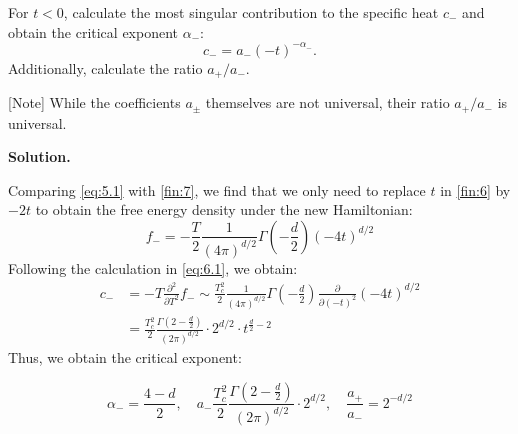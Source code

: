 \documentclass[11pt,a4paper]{article}
\newcounter{problem}
\newcounter{saveequation}
\newenvironment{solution}
{
	\par
	\setcounter{saveequation}{\value{equation}}
	\begingroup
	\setcounter{equation}{0}
	\renewcommand{\theequation}{\arabic{problem}.\arabic{equation}}
	\renewcommand{\theHequation}{sol.\arabic{problem}.\arabic{equation}}
	\noindent\textbf{Solution.}\quad
}
{
	\par
	\endgroup
	\setcounter{equation}{\value{saveequation}}
}
\begin{document}
	\begin{problembox}
		For $t < 0$, calculate the most singular contribution to the specific heat $c_-$ and obtain the critical exponent $\alpha_-$:
		\begin{equation}
			c_- = a_- (-t)^{-\alpha_-}.
		\end{equation}
		Additionally, calculate the ratio $a_+/a_-$.
		
		[Note] While the coefficients $a_\pm$ themselves are not universal, their ratio $a_+/a_-$ is universal.
	\end{problembox}
	\begin{solution}
	Comparing \eqref{eq:5.1} with \eqref{fin:7}, we find that we only need to replace $t$ in \eqref{fin:6} by $-2t$ to obtain the free energy density under the new Hamiltonian:
	\begin{equation}
		f_-=-\frac T2\frac{1}{(4\pi)^{d/2}}\Gamma\left(-\frac d2\right)(-4t)^{d/2}
	\end{equation}
	Following the calculation in \eqref{eq:6.1}, we obtain:
	\begin{equation}
		\begin{aligned}
			c_-&=-T\frac{\partial^2}{\partial T^2}f_-\sim \frac{T_c^2}{2}\frac{1}{(4\pi)^{d/2}}\Gamma\left(-\frac d2\right) \frac{\partial}{\partial (-t)^2} (-4t)^{d/2}\\
			&=\frac{T_c^2}{2}\frac{\Gamma{\left(2-\frac d2\right)}}{(2\pi)^{d/2}}\cdot 2^{d/2}\cdot t^{\frac d2-2}
		\end{aligned}
	\end{equation}
	Thus, we obtain the critical exponent:
	\begin{finalanswer}
		\begin{equation}
			\label{fin:8}
			\alpha_-=\frac{4-d}{2},\quad a_-\frac{T_c^2}{2}\frac{\Gamma{\left(2-\frac d2\right)}}{(2\pi)^{d/2}}\cdot 2^{d/2},\quad\frac{a_+}{a_-}=2^{-d/2}
		\end{equation}
	\end{finalanswer}
\end{solution}
\end{document}
